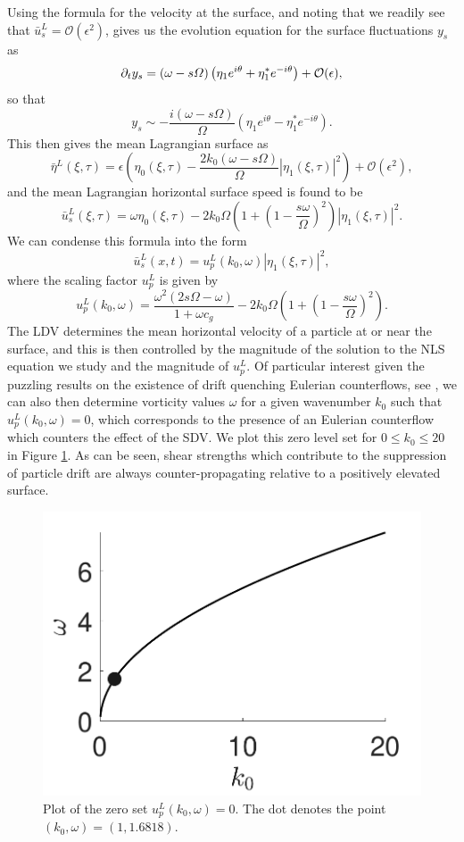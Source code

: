 \documentclass{JFM_Style/jfm}
\begin{document}
Using the formula for the velocity at the surface, and noting that we readily see that $\bar{u}^{L}_{s} = \mathcal{O}(\epsilon^{2})$, gives us the evolution equation for the surface fluctuations $y_{s}$ as 
\[
\partial_{t}y_{s} = (\omega -s\varOmega) \left(\eta_{1}e^{i\theta} + \eta_{1}^{\ast}e^{-i\theta}\right) + \mathcal{O}(\epsilon), 
\]
so that
\[
y_{s} \sim -\frac{i(\omega-s\Omega)}{\Omega}  \left(\eta_{1}e^{i\theta} - \eta_{1}^{\ast}e^{-i\theta}\right).
\]
This then gives the mean Lagrangian surface as 
\[
\bar{\eta}^{L}(\xi,\tau) = \epsilon \left(\eta_{0}(\xi,\tau) - \frac{2k_{0}(\omega-s\Omega)}{\Omega}|\eta_{1}(\xi,\tau)|^{2}\right) + \mathcal{O}(\epsilon^{2}),
\]
and the mean Lagrangian horizontal surface speed is found to be
\[
\bar{u}^{L}_{s}(\xi,\tau) = \omega\eta_{0}(\xi,\tau)-2k_{0}\Omega\left( 1 + \left(1-\frac{s\omega}{\Omega}\right)^{2}\right)|\eta_{1}(\xi,\tau)|^{2}.
\]
We can condense this formula into the form 
\[
\bar{u}^{L}_{s}(x,t) = u^{L}_{p}(k_{0},\omega)|\eta_{1}(\xi,\tau)|^{2},
\]
where the scaling factor $u^{L}_{p}$ is given by
\[
u^{L}_{p}(k_{0},\omega) =  \frac{ \omega^{2}(2s\Omega - \omega)}{1+\omega c_{g}} - 2k_{0}\Omega\left(1 + \left(1 - \frac{s\omega}{\Omega} \right)^{2}\right).
\]
The LDV determines the mean horizontal velocity of a particle at or near the surface, and this is then controlled by the magnitude of the solution to the NLS equation we study and the magnitude of $u^{L}_{p}$.  Of particular interest given the puzzling results on the existence of drift quenching Eulerian counterflows, see \cite{monismith,smith}, we can also then determine vorticity values $\omega$ for a given wavenumber $k_{0}$ such that $u^{L}_{p}(k_{0},\omega) =0$, which corresponds to the presence of an Eulerian counterflow which counters the effect of the SDV.  We plot this zero level set for $0\leq k_{0}\leq 20$ in Figure \ref{fig:zerodriftk0}.  As can be seen, shear strengths which contribute to the suppression of particle drift are always counter-propagating relative to a positively elevated surface.
\begin{figure}
\centering
\includegraphics[width=.45\textwidth]{zero_return_shear}
\caption{\small Plot of the zero set $u^{L}_{p}(k_{0},\omega)=0$.  The dot denotes the point $(k_{0},\omega)=(1,1.6818)$.}
\label{fig:zerodriftk0}
\end{figure}
\end{document}
